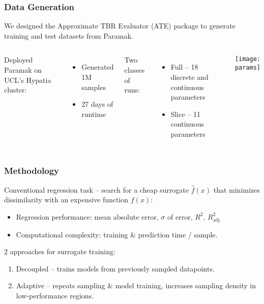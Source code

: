 \begin{frame}
	\frametitle{Data Generation}
	We designed the Approximate TBR Evaluator (ATE) package to generate training and test datasets from Paramak.\newline
	 \begin{columns}[onlytextwidth,T]
      \column{\dimexpr\linewidth-7cm-5mm}
        
        Deployed Paramak on UCL's Hypatia cluster:
        \begin{itemize}
            \item Generated 1M samples
            \item 27 days of runtime
        \end{itemize}
        
        	\vspace{10pt}
        
        Two classes of runs:
        \begin{itemize}
            \item Full -- 18 discrete and continuous parameters
            \item Slice -- 11 continuous parameters
        \end{itemize}
        
      \column{7cm}
      \vspace{-0.5cm}
      \texttt{[image: params]}

    \end{columns}
\end{frame}


\begin{frame}
	\frametitle{Methodology}
		Conventional regression task -- search for a cheap surrogate $\hat{f}(x)$ that
		minimizes dissimilarity with an expensive function $f(x)$:

		\begin{itemize}
			\item
				Regression performance: mean absolute error, $\sigma$ of
				error, $R^2$, $R^2_\text{adj.}$
			\item
				Computational complexity:
				training \& prediction time / sample.
		\end{itemize}

		\vspace{2em}

		2 approaches for surrogate training:
		\begin{enumerate}
			\item
				Decoupled -- trains models from previously sampled
				datapoints.
			\item
				Adaptive -- repeats sampling \& model training, increases
				sampling density in low-performance regions.
		\end{enumerate}
\end{frame}

